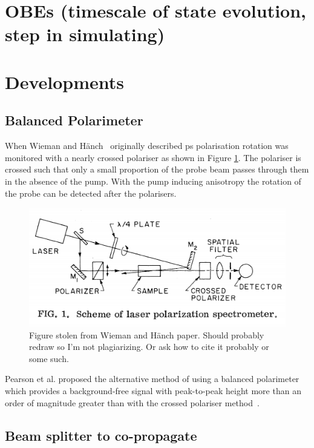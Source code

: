 \section{OBEs (timescale of state evolution, step in simulating)}

\section{Developments}

\subsection{Balanced Polarimeter}
When Wieman and H\"anch~\cite{wieman_doppler-free_1976} originally described \gls{ps} polarisation rotation was monitored with a nearly crossed polariser as shown in Figure \ref{figure:wieman_doppler-free_schematic}.
The polariser is crossed such that only a small proportion of the probe beam passes through them in the absence of the pump.
With the pump inducing anisotropy the rotation of the probe can be detected after the polarisers.

\begin{figure}
\includegraphics[width=\linewidth]{part1/Figs/wieman_doppler-free_schematic.png}
\caption{Figure stolen from Wieman and H\"anch paper.
Should probably redraw so I'm not plagiarizing.
Or ask how to cite it probably or some such.}
\label{figure:wieman_doppler-free_schematic}
\end{figure}

Pearson et al. proposed the alternative method of using a balanced polarimeter which provides a background-free signal with peak-to-peak height more than an order of magnitude greater than with the crossed polariser method~\cite{pearman_polarization_2002}.

\subsection{Beam splitter to co-propagate}


